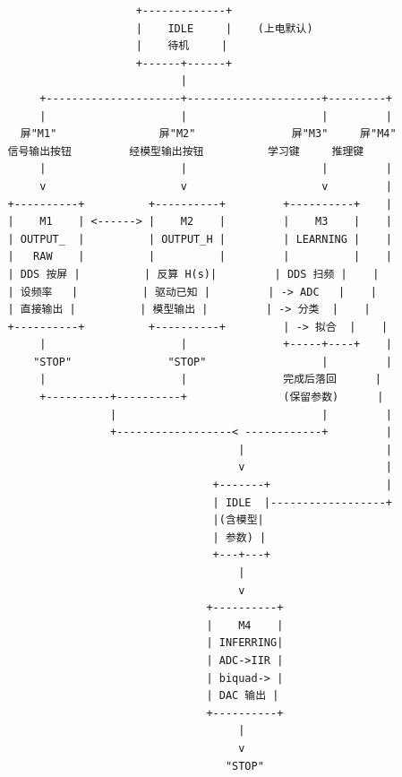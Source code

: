 \documentclass[a4paper]{article}
\begin{document}
\begin{center}
\begin{minipage}{0.92\textwidth}
\begin{verbatim}
                       +-------------+
                       |    IDLE     |    (上电默认)
                       |    待机     |
                       +------+------+
                              |
        +---------------------+---------------------+---------+
        |                     |                     |         |
     屏"M1"                屏"M2"               屏"M3"     屏"M4"
   信号输出按钮         经模型输出按钮          学习键     推理键
        |                     |                     |         |
        v                     v                     v         |
   +----------+          +----------+         +----------+    |
   |    M1    | <------> |    M2    |         |    M3    |    |
   | OUTPUT_  |          | OUTPUT_H |         | LEARNING |    |
   |   RAW    |          |          |         |          |    |
   | DDS 按屏 |          | 反算 H(s)|         | DDS 扫频 |    |
   | 设频率   |          | 驱动已知 |         | -> ADC   |    |
   | 直接输出 |          | 模型输出 |         | -> 分类  |    |
   +----------+          +----------+         | -> 拟合  |    |
        |                     |               +-----+----+    |
       "STOP"               "STOP"                  |         |
        |                     |               完成后落回      |
        +----------+----------+               (保留参数)      |
                   |                                |         |
                   +------------------< ------------+         |
                                       |                      |
                                       v                      |
                                   +-------+                  |
                                   | IDLE  |------------------+
                                   |(含模型|
                                   | 参数) |
                                   +---+---+
                                       |
                                       v
                                  +----------+
                                  |    M4    |
                                  | INFERRING|
                                  | ADC->IIR |
                                  | biquad-> |
                                  | DAC 输出 |
                                  +----------+
                                       |
                                       v
                                     "STOP"
\end{verbatim}
\end{minipage}
\end{center}
\end{document}
